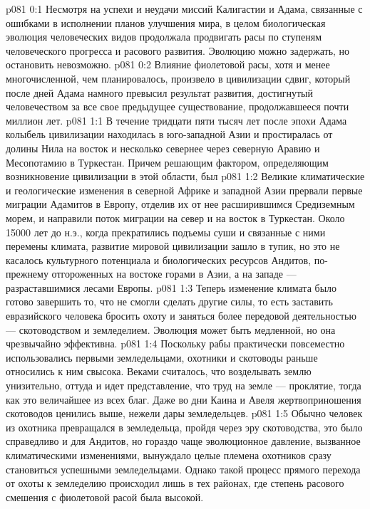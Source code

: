\vs p081 0:1 Несмотря на успехи и неудачи миссий Калигастии и Адама, связанные с ошибками в исполнении планов улучшения мира, в целом биологическая эволюция человеческих видов продолжала продвигать расы по ступеням человеческого прогресса и расового развития. Эволюцию можно задержать, но остановить невозможно.
\vs p081 0:2 Влияние фиолетовой расы, хотя и менее многочисленной, чем планировалось, произвело в цивилизации сдвиг, который после дней Адама намного превысил результат развития, достигнутый человечеством за все свое предыдущее существование, продолжавшееся почти миллион лет.
\vs p081 1:1 В течение тридцати пяти тысяч лет после эпохи Адама колыбель цивилизации находилась в юго\hyp{}западной Азии и простиралась от долины Нила на восток и несколько севернее через северную Аравию и Месопотамию в Туркестан. Причем решающим фактором, определяющим возникновение цивилизации в этой области, был 
\vs p081 1:2 Великие климатические и геологические изменения в северной Африке и западной Азии прервали первые миграции Адамитов в Европу, отделив их от нее расширившимся Средиземным морем, и направили поток миграции на север и на восток в Туркестан. Около 15000 лет до н.э., когда прекратились подъемы суши и связанные с ними перемены климата, развитие мировой цивилизации зашло в тупик, но это не касалось культурного потенциала и биологических ресурсов Андитов, по\hyp{}прежнему отгороженных на востоке горами в Азии, а на западе --- разраставшимися лесами Европы.
\vs p081 1:3 Теперь изменение климата было готово завершить то, что не смогли сделать другие силы, то есть заставить евразийского человека бросить охоту и заняться более передовой деятельностью --- скотоводством и земледелием. Эволюция может быть медленной, но она чрезвычайно эффективна.
\vs p081 1:4 Поскольку рабы практически повсеместно использовались первыми земледельцами, охотники и скотоводы раньше относились к ним свысока. Веками считалось, что возделывать землю унизительно, оттуда и идет представление, что труд на земле --- проклятие, тогда как это величайшее из всех благ. Даже во дни Каина и Авеля жертвоприношения скотоводов ценились выше, нежели дары земледельцев.
\vs p081 1:5 Обычно человек из охотника превращался в земледельца, пройдя через эру скотоводства, это было справедливо и для Андитов, но гораздо чаще эволюционное давление, вызванное климатическими изменениями, вынуждало целые племена охотников сразу становиться успешными земледельцами. Однако такой процесс прямого перехода от охоты к земледелию происходил лишь в тех районах, где степень расового смешения с фиолетовой расой была высокой.
